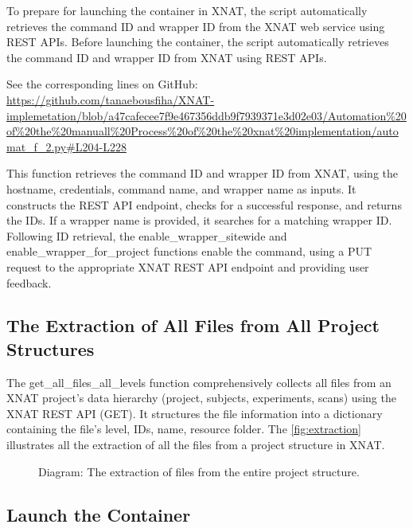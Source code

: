 To prepare for launching the container in XNAT, the script automatically retrieves the command ID and wrapper ID from the XNAT web service using REST APIs.
Before launching the container, the script automatically retrieves the command ID and wrapper ID from XNAT using REST APIs.


\noindent\footnotesize See the corresponding lines on GitHub:\url{ https://github.com/tanaebousfiha/XNAT-implemetation/blob/a47cafecee7f9e467356ddb9f7939371e3d02e03/Automation%20of%20the%20manuall%20Process%20of%20the%20xnat%20implementation/automat_f_2.py#L204-L228}
\normalsize


This function retrieves the command ID and wrapper ID from XNAT, using the hostname, credentials, command name, and wrapper name as inputs. It constructs the REST API endpoint, checks for a successful response, and returns the IDs. If a wrapper name is provided, it searches for a matching wrapper ID. Following ID retrieval, the enable\_wrapper\_sitewide and enable\_wrapper\_for\_project functions enable the command, using a PUT request to the appropriate XNAT REST API endpoint and providing user feedback.

\subsection{The Extraction of All Files from All Project Structures}

The get\_all\_files\_all\_levels function comprehensively collects all files from an XNAT project's data hierarchy (project, subjects, experiments, scans) using the XNAT REST API (GET). It structures the file information into a dictionary containing the file's level, IDs, name, resource folder. The \autoref{fig:extraction} illustrates all the extraction of all the files from a project structure in XNAT.

\begin{figure}[H]
    \centering
    \def\svgwidth{0.7\linewidth}
    
    \caption{Diagram: The extraction of files from the entire project structure.}
    \label{fig:extraction}
\end{figure}

\subsection{Launch the Container}

